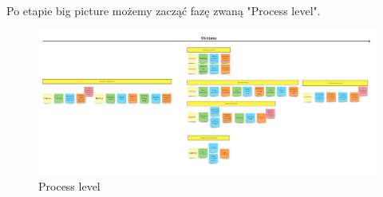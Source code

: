 \documentclass{article}
\begin{document}
      Po etapie big picture możemy zacząć fazę zwaną "Process level". 
      \begin{figure}[h]
            \centering
            \includegraphics[width=0.9\linewidth]{ProcessLevel.jpg}
            \caption{Process level}
      \end{figure}
\end{document}
